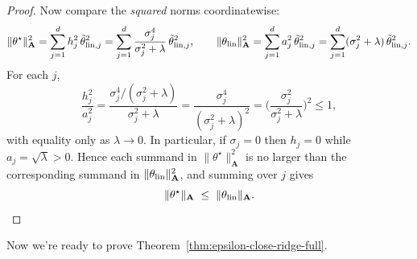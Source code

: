 \documentclass{article}
\def\amat{\mathbf{A}}
\newcommand{\1}{\mathbbm{1}}
\begin{document}
\begin{proof}
Now compare the \emph{squared} norms coordinatewise:
\[
\|\theta^\star\|_{\amat}^2
= \sum_{j=1}^d h_j^2\,\tilde\theta_{{\rm lin},j}^2
= \sum_{j=1}^d \frac{\sigma_j^4}{\sigma_j^2+\lambda}\,\tilde\theta_{{\rm lin},j}^2,
\qquad
\|\theta_{\rm lin}\|_{\amat}^2
= \sum_{j=1}^d a_j^2\,\tilde\theta_{{\rm lin},j}^2
= \sum_{j=1}^d (\sigma_j^2+\lambda)\,\tilde\theta_{{\rm lin},j}^2.
\]
For each $j$,
\[
\frac{h_j^2}{a_j^2}
= \frac{\sigma_j^4/(\sigma_j^2+\lambda)}{\sigma_j^2+\lambda}
= \frac{\sigma_j^4}{(\sigma_j^2+\lambda)^2}
= \Big(\frac{\sigma_j^2}{\sigma_j^2+\lambda}\Big)^2 \le 1,
\]
with equality only as $\lambda\to 0$. In particular, if $\sigma_j=0$ then $h_j=0$ while $a_j=\sqrt{\lambda}>0$.
Hence each summand in $\|\theta^\star\|_{\amat}^2$ is no larger than the corresponding summand in
$\|\theta_{\rm lin}\|_{\amat}^2$, and summing over $j$ gives
\[
\|\theta^\star\|_{\amat}\;\le\;\|\theta_{\rm lin}\|_{\amat}.
\]

\end{proof}

Now we're ready to prove Theorem~\eqref{thm:epsilon-close-ridge-full}.
\end{document}
